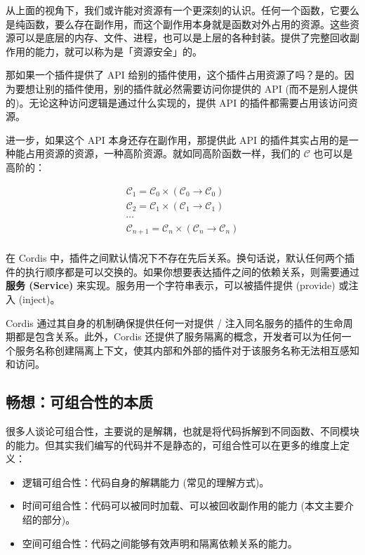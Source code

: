 \documentclass[
  chinese,
  11pt,
]{article}
\providecommand{\tightlist}{%
  \setlength{\itemsep}{0pt}\setlength{\parskip}{0pt}}
\begin{document}
从上面的视角下，我们或许能对资源有一个更深刻的认识。任何一个函数，它要么是纯函数，要么存在副作用，而这个副作用本身就是函数对外占用的资源。这些资源可以是底层的内存、文件、进程，也可以是上层的各种封装。提供了完整回收副作用的能力，就可以称为是「资源安全」的。

那如果一个插件提供了 API
给别的插件使用，这个插件占用资源了吗？是的。因为要想让别的插件使用，别的插件就必然需要访问你提供的
API (而不是别人提供的)。无论这种访问逻辑是通过什么实现的，提供 API
的插件都需要占用该访问资源。

进一步，如果这个 API 本身还存在副作用，那提供此 API
的插件其实占用的是一种能占用资源的资源，一种高阶资源。就如同高阶函数一样，我们的
\(\mathcal{C}\) 也可以是高阶的：

\[
\begin{matrix}
\mathcal{C}_1=\mathcal{C}_0\times\left(\mathcal{C}_0\to\mathcal{C}_0\right)\\
\mathcal{C}_2=\mathcal{C}_1\times\left(\mathcal{C}_1\to\mathcal{C}_1\right)\\
\cdots\\
\mathcal{C}_{n+1}=\mathcal{C}_n\times\left(\mathcal{C}_n\to\mathcal{C}_n\right)\\
\end{matrix}
\]

在 Cordis
中，插件之间默认情况下不存在先后关系。换句话说，默认任何两个插件的执行顺序都是可以交换的。如果你想要表达插件之间的依赖关系，则需要通过
\textbf{服务 (Service)} 来实现。服务用一个字符串表示，可以被插件提供
(provide) 或注入 (inject)。

Cordis 通过其自身的机制确保提供任何一对提供 /
注入同名服务的插件的生命周期都是包含关系。此外，Cordis
还提供了服务隔离的概念，开发者可以为任何一个服务名称创建隔离上下文，使其内部和外部的插件对于该服务名称无法相互感知和访问。

\subsection{畅想：可组合性的本质}\label{ux7545ux60f3ux53efux7ec4ux5408ux6027ux7684ux672cux8d28}

很多人谈论可组合性，主要说的是解耦，也就是将代码拆解到不同函数、不同模块的能力。但其实我们编写的代码并不是静态的，可组合性可以在更多的维度上定义：

\begin{itemize}
\tightlist
\item
  逻辑可组合性：代码自身的解耦能力 (常见的理解方式)。
\item
  时间可组合性：代码可以被同时加载、可以被回收副作用的能力
  (本文主要介绍的部分)。
\item
  空间可组合性：代码之间能够有效声明和隔离依赖关系的能力。
\end{itemize}
\end{document}
